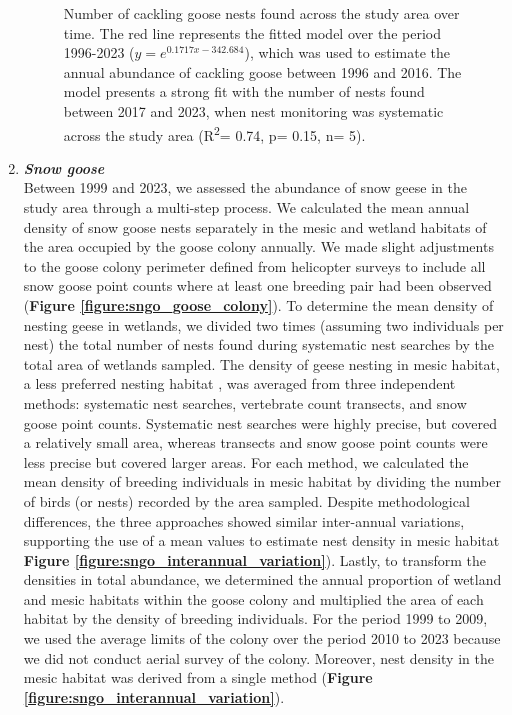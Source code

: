 \documentclass[a4paper,twoside,12pt]{article}
\begin{document}
\begin{enumerate}[label=\alph*.]
\begin{figure}[h]
\caption{Number of cackling goose nests found across the study area over time. The red line represents the fitted model over the period 1996-2023 ($y= e^{0.1717x-342.684}$), which was used to estimate the annual abundance of cackling goose between 1996 and 2016. The model presents a strong fit with the number of nests found between 2017 and 2023, when nest monitoring was systematic across the study area (R\textsuperscript{2}= 0.74, p= 0.15, n= 5).}
\label{figure:cackling}
\end{figure}
      \item[] \textit{\textbf{Snow goose}}\\
       Between 1999 and 2023, we assessed the abundance of snow geese in the study area through a multi-step process. We calculated the mean annual density of snow goose nests separately in the mesic and wetland habitats of the area occupied by the goose colony annually. We made slight adjustments to the goose colony perimeter defined from helicopter surveys to include all snow goose point counts where at least one breeding pair had been observed (\textbf{Figure \ref{figure:sngo_goose_colony}}). To determine the mean density of nesting geese in wetlands, we divided two times (assuming two individuals per nest) the total number of nests found during systematic nest searches by the total area of wetlands sampled. The density of geese nesting in mesic habitat, a less preferred nesting habitat \citep{lecomte2008}, was averaged from three independent methods: systematic nest searches, vertebrate count transects, and snow goose point counts. Systematic nest searches were highly precise, but covered a relatively small area, whereas transects and snow goose point counts were less precise but covered larger areas. For each method, we calculated the mean density of breeding individuals in mesic habitat by dividing the number of birds (or nests) recorded by the area sampled. Despite methodological differences, the three approaches showed similar inter-annual variations, supporting the use of a mean values to estimate nest density in mesic habitat \textbf{Figure \ref{figure:sngo_interannual_variation}}). Lastly, to transform the densities in total abundance, we determined the annual proportion of wetland and mesic habitats within the goose colony and multiplied the area of each habitat by the density of breeding individuals. For the period 1999 to 2009, we used the average limits of the colony over the period 2010 to 2023 because we did not conduct aerial survey of the colony. Moreover, nest density in the mesic habitat was derived from a single method (\textbf{Figure \ref{figure:sngo_interannual_variation}}). 

\end{enumerate}
\end{document}
